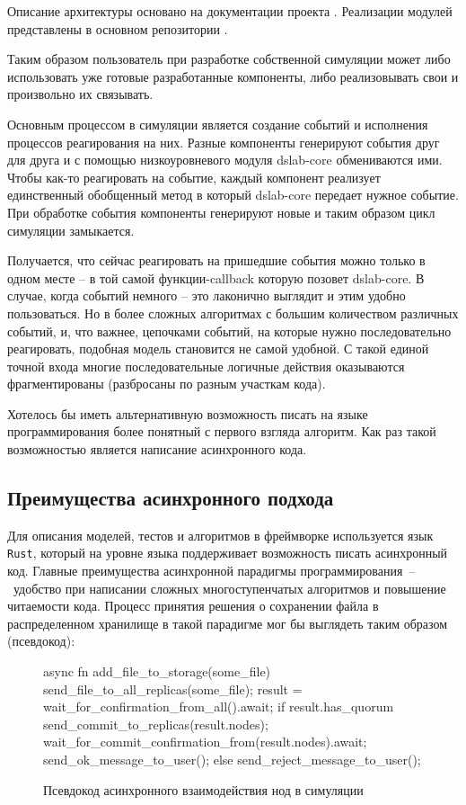 Описание архитектуры основано на документации проекта \cite{dslab-architecture}.  Реализации модулей представлены в основном репозитории \cite{dslab-repo}.

Таким образом пользователь при разработке собственной симуляции может либо использовать уже готовые разработанные компоненты, либо реализовывать свои и произвольно их связывать. 

Основным процессом в симуляции является создание событий и исполнения процессов реагирования на них. Разные компоненты генерируют события друг для друга и с помощью низкоуровневого модуля dslab-core обмениваются ими. Чтобы как-то реагировать на событие, каждый компонент реализует единственный обобщенный метод в который dslab-core передает нужное событие. При обработке события компоненты генерируют новые и таким образом цикл симуляции замыкается. 

Получается, что сейчас реагировать на пришедшие события можно только в одном месте -- в той самой функции-callback которую позовет dslab-core. В случае, когда событий немного -- это лаконично выглядит и этим удобно пользоваться. Но в более сложных алгоритмах с большим количеством различных событий, и, что важнее, цепочками событий, на которые нужно последовательно реагировать, подобная модель становится не самой удобной. С такой единой точной входа многие последовательные логичные действия оказываются фрагментированы (разбросаны по разным участкам кода). 

Хотелось бы иметь альтернативную возможность писать на языке программирования более понятный с первого взгляда алгоритм. Как раз такой возможностью является написание асинхронного кода.


\subsection{Преимущества асинхронного подхода}

Для описания моделей, тестов и алгоритмов в фреймворке используется язык \texttt{Rust}, который на уровне языка поддерживает возможность писать асинхронный код. Главные преимущества асинхронной парадигмы программирования~--~удобство при написании сложных многоступенчатых алгоритмов и повышение читаемости кода. Процесс принятия решения о сохранении файла в распределенном хранилище в такой парадигме мог бы выглядеть таким образом (псевдокод):

\begin{figure}[H]
    \small
\begin{rustcode}
    async fn add_file_to_storage(some_file) {
        send_file_to_all_replicas(some_file);
        result = wait_for_confirmation_from_all().await;
        if result.has_quorum {
            send_commit_to_replicas(result.nodes);
            wait_for_commit_confirmation_from(result.nodes).await;
            send_ok_message_to_user();
        } else {
            send_reject_message_to_user();
        }
    }
\end{rustcode}
\caption{Псевдокод асинхронного взаимодействия нод в симуляции}
\label{pseudocode}
\end{figure}

